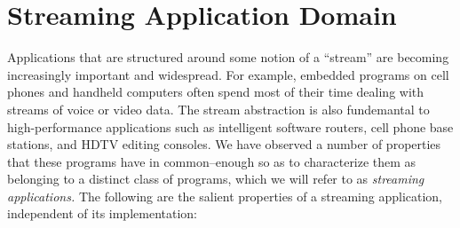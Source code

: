 \section{Streaming Application Domain}

Applications that are structured around some notion of a ``stream''
are becoming increasingly important and widespread.  For example,
embedded programs on cell phones and handheld computers often spend
most of their time dealing with streams of voice or video data.  The
stream abstraction is also fundemantal to high-performance
applications such as intelligent software routers, cell phone base
stations, and HDTV editing consoles.  We have observed a number of
properties that these programs have in common--enough so as to
characterize them as belonging to a distinct class of programs, which
we will refer to as {\it streaming applications.}  The following are
the salient properties of a streaming application, independent of its
implementation:


